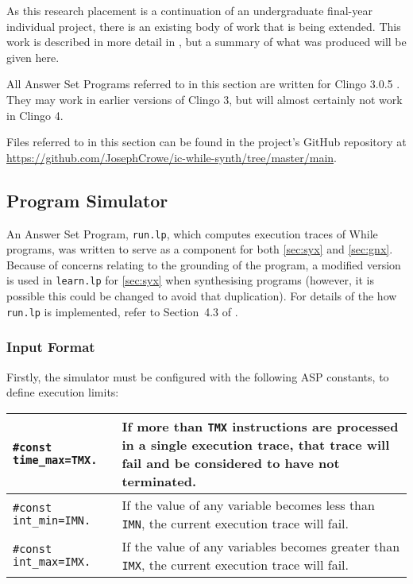 \documentclass[a4paper,twoside,notitlepage,12pt]{article}
\begin{document}
As this research placement is a continuation of an undergraduate final-year individual 
project, there is an existing body of work that is being extended. This work is 
described in more detail in \cite{final}, but a summary of what was produced will be 
given here.

All Answer Set Programs referred to in this section are written for Clingo 3.0.5 
\cite{clingo3}. They may work in earlier versions of Clingo 3, but will almost
certainly not work in Clingo 4.

Files referred to in this section can be found in the project's GitHub repository at \\
\url{https://github.com/JosephCrowe/ic-while-synth/tree/master/main}.

\subsection{Program Simulator} \label{sec:sim}

An Answer Set Program, \verb|run.lp|, which computes execution traces of While 
programs, was written to serve as a component for both \ref{sec:syx} and 
\ref{sec:gnx}. Because of concerns relating to the grounding of the program, a 
modified version is used in \verb|learn.lp| for \ref{sec:syx} when synthesising 
programs (however, it is possible this could be changed to avoid that duplication). For 
details of the how \verb|run.lp| is implemented, refer to Section~4.3 of \cite{final}.

\subsubsection{Input Format} \label{sec:sim:inp}

Firstly, the simulator must be configured with the following ASP constants, to define 
execution limits:

\begin{tabularx}{\textwidth}{|l|X|}
\hline
\verb|#const time_max=TMX.| &
If more than \verb|TMX| instructions are processed in a single execution trace, that 
trace will fail and be considered to have not terminated. \\*
\hline
\verb|#const int_min=IMN.| &
If the value of any variable becomes less than \verb|IMN|, the current execution trace 
will fail. \\*
\hline
\verb|#const int_max=IMX.| &
If the value of any variables becomes greater than \verb|IMX|, the current execution 
trace will fail. \\*
\hline
\end{tabularx}
\end{document}
